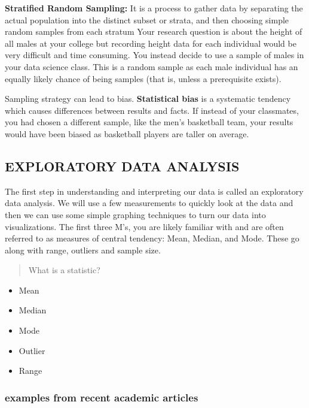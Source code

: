 \documentclass[
]{book}
\providecommand{\tightlist}{%
  \setlength{\itemsep}{0pt}\setlength{\parskip}{0pt}}
\begin{document}
\textbf{Stratified Random Sampling:} It is a process to gather data by separating the actual population into the distinct subset or strata, and then choosing simple random samples from each stratum Your research question is about the height of all males at your college but recording height data for each individual would be very difficult and time consuming. You instead decide to use a sample of males in your data science class. This is a random sample as each male individual has an equally likely chance of being samples (that is, unless a prerequisite exists).

Sampling strategy can lead to bias. \textbf{Statistical bias} is a systematic tendency which causes differences between results and facts. If instead of your classmates, you had chosen a different sample, like the men's basketball team, your results would have been biased as basketball players are taller on average.

\hypertarget{exploratory-data-analysis}{%
\subsection{EXPLORATORY DATA ANALYSIS}\label{exploratory-data-analysis}}

The first step in understanding and interpreting our data is called an exploratory data analysis. We will use a few measurements to quickly look at the data and then we can use some simple graphing techniques to turn our data into visualizations. The first three M's, you are likely familiar with and are often referred to as measures of central tendency: Mean, Median, and Mode.
These go along with range, outliers and sample size.

\begin{quote}
What is a statistic?
\end{quote}

\begin{itemize}
\tightlist
\item
  Mean
\item
  Median
\item
  Mode
\item
  Outlier
\item
  Range
\end{itemize}

\hypertarget{examples-from-recent-academic-articles}{%
\subsubsection{examples from recent academic articles}\label{examples-from-recent-academic-articles}}
\end{document}
